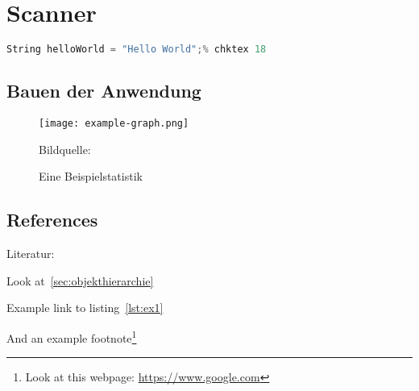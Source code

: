 \chapter{Scanner}\label{chap:intro}

\lipsum[1]{}

\begin{lstlisting}[language=C++,numbers=none,caption=Ein Beispiel Codestück,label=lst:ex1]
String helloWorld = "Hello World";% chktex 18
\end{lstlisting}

\section{Bauen der Anwendung}
\lipsum{}

\begin{figure}[!htb]
    \centering
      \texttt{[image: example-graph.png]}
    \caption{Eine Beispielstatistik}{Bildquelle:~\cite{JavaBeginner-Binding}}\label{fig:example}
\end{figure}

\lipsum{}
\section{References}

Literatur:~\cite{Example}

Look at~\ref{sec:objekthierarchie}

Example link to listing~\ref{lst:ex1}

And an example footnote\footnote{Look at this webpage: \url{https://www.google.com}}

\lipsum[2-3]{}%
